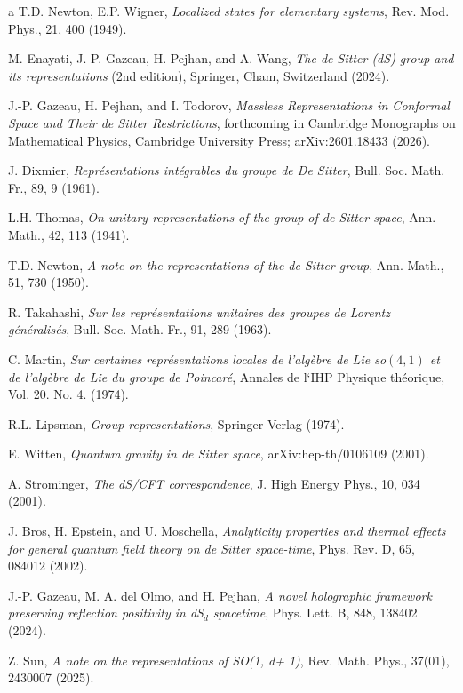 \documentclass[aps,twocolumn,nofootinbib]{revtex4}
\begin{document}
{\begin{thebibliography}{a}
 T.D. Newton, E.P. Wigner, \emph{Localized states for elementary systems}, Rev. Mod. Phys., 21, 400 (1949).

 M. Enayati, J.-P. Gazeau, H. Pejhan, and A. Wang, \emph{The de Sitter (dS) group and its representations} (2nd edition), Springer, Cham, Switzerland (2024).

 J.-P. Gazeau, H. Pejhan, and I. Todorov, \emph{Massless Representations in Conformal Space and Their de Sitter Restrictions}, forthcoming in Cambridge Monographs on Mathematical Physics, Cambridge University Press; arXiv:2601.18433 (2026).

 J. Dixmier, \emph{Représentations intégrables du groupe de De Sitter}, Bull. Soc. Math. Fr., 89, 9 (1961).

 L.H. Thomas, \emph{On unitary representations of the group of de Sitter space}, Ann. Math., 42, 113 (1941).

 T.D. Newton, \emph{A note on the representations of the de Sitter group}, Ann. Math., 51, 730 (1950).

 R. Takahashi, \emph{Sur les représentations unitaires des groupes de Lorentz généralisés}, Bull. Soc. Math. Fr., 91, 289 (1963).

 C. Martin, \emph{Sur certaines représentations locales de l'algèbre de Lie so$(4,1)$ et de l'algèbre de Lie du groupe de Poincar\'{e}}, Annales de l`IHP Physique th\'{e}orique, Vol. 20. No. 4. (1974).

 R.L. Lipsman, \emph{Group representations}, Springer-Verlag (1974).

 E. Witten, \emph{Quantum gravity in de Sitter space}, arXiv:hep-th/0106109 (2001).

 A. Strominger, \emph{The dS/CFT correspondence}, J. High Energy Phys., 10, 034 (2001).

 J. Bros, H. Epstein, and U. Moschella, \emph{Analyticity properties and thermal effects for general quantum field theory on de Sitter space-time}, Phys. Rev. D, 65, 084012 (2002).

 J.-P. Gazeau, M. A. del Olmo, and H. Pejhan, \emph{A novel holographic framework preserving reflection positivity in dS$_d$ spacetime}, Phys. Lett. B, 848, 138402 (2024).

 Z. Sun, \emph{A note on the representations of SO(1, d+ 1)}, Rev. Math. Phys., 37(01), 2430007 (2025).


\end{thebibliography}}
\end{document}
